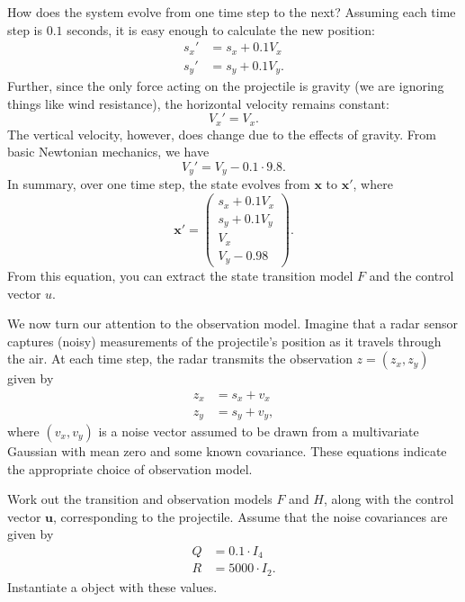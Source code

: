 How does the system evolve from one time step to the next?
Assuming each time step is $0.1$ seconds, it is easy enough to calculate the new position:
\begin{align*}
s_x' &= s_x + 0.1V_x\\
s_y' &= s_y + 0.1V_y.
\end{align*}
Further, since the only force acting on the projectile is gravity (we are ignoring things like wind resistance), the horizontal velocity remains constant:
\[
V_x' = V_x.
\]
The vertical velocity, however, does change due to the effects of gravity.
From basic Newtonian mechanics, we have
\[
V_y' = V_y - 0.1\cdot9.8.
\]
In summary, over one time step, the state evolves from $\mathbf{x}$ to $\mathbf{x}'$, where
\[
\mathbf{x}' = \left( \begin{array}{c} s_{x} + 0.1V_x \\ s_{y} + 0.1V_y \\ V_{x} \\ V_{y} - 0.98 \end{array} \right).
\]
From this equation, you can extract the state transition model $F$ and the control vector $u$.

We now turn our attention to the observation model.
Imagine that a radar sensor captures (noisy) measurements of the projectile's position as it travels through the air.
At each time step, the radar transmits the observation $z = (z_x, z_y)$ given by
\begin{align*}
z_x &= s_x + v_x\\
z_y &= s_y + v_y,
\end{align*}
where $(v_x, v_y)$ is a noise vector assumed to be drawn from a multivariate Gaussian with mean zero and some known covariance.
These equations indicate the appropriate choice of observation model.

\begin{problem}
Work out the transition and observation models $F$ and $H$, along with the control vector $\mathbf{u}$, corresponding to the projectile.
Assume that the noise covariances are given by
\begin{align*}
Q &= 0.1 \cdot I_4\\
R &= 5000 \cdot I_2.
\end{align*}
Instantiate a  object with these values.
\end{problem}

